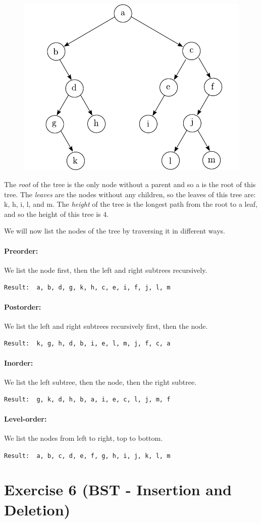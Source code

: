 \documentclass[a4paper, 11pt, notitlepage, english]{article}
\begin{document}
\begin{figure}[hbtp]
 \centering
 \includegraphics[width=\textwidth]{tree}
\end{figure}

The \emph{root} of the tree is the only node without a parent and so a is the root of this tree. The \emph{leaves} are the nodes without any children, so the leaves of this tree are: k, h, i, l, and m. The \emph{height} of the tree is the longest path from the root to a leaf, and so the height of this tree is 4.

We will now list the nodes of the tree by traversing it in different ways.
\paragraph{Preorder:} We list the node first, then the left and right subtrees recursively.
\begin{center}
\verb+Result:  a, b, d, g, k, h, c, e, i, f, j, l, m+ 
\end{center}
\paragraph{Postorder:} We list the left and right subtrees recursively first, then the node.
\begin{center}
\verb+Result:  k, g, h, d, b, i, e, l, m, j, f, c, a+ 
\end{center}
\paragraph{Inorder:} We list the left subtree, then the node, then the right subtree.
\begin{center}
\verb+Result:  g, k, d, h, b, a, i, e, c, l, j, m, f+ 
\end{center}
\paragraph{Level-order:} We list the nodes from left to right, top to bottom.
\begin{center}
\verb+Result:  a, b, c, d, e, f, g, h, i, j, k, l, m+ 
\end{center}

\section*{Exercise 6 (BST - Insertion and Deletion)}
\end{document}
